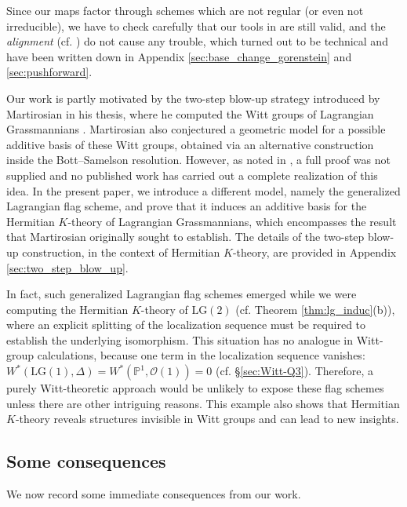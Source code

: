 \documentclass[a4paper]{amsart}
\theoremstyle{plain}
\theoremstyle{definition}
\numberwithin{equation}{section}
\newcommand{\LG}{\mathrm{LG}}
\begin{document}
Since our maps factor through schemes which are not regular (or even not irreducible), we have to check carefully that our tools in \cite{huang2023the} are still valid, and the \textit{alignment} (cf. \cite{balmer2012bases}) do not cause any trouble, which turned out to be technical and have been written down in Appendix \ref{sec:base_change_gorenstein} and \ref{sec:pushforward}.

Our work is partly motivated by the two-step blow-up strategy introduced by Martirosian in his thesis, where he computed the Witt groups of Lagrangian Grassmannians \cite{martirosian2021witt}.  Martirosian also conjectured a geometric model for a possible additive basis of these Witt groups, obtained via an alternative construction inside the Bott–Samelson resolution. However, as noted in \cite[Remark 3.4.6]{martirosian2021witt}, a full proof was not supplied and no published work has carried out a complete realization of this idea. In the present paper, we introduce a different model, namely the generalized Lagrangian flag scheme, and prove that it induces an additive basis for the Hermitian $K$-theory of Lagrangian Grassmannians, which encompasses the result that Martirosian originally sought to establish. The details of the two-step blow-up construction, in the context of Hermitian $K$-theory, are provided in Appendix \ref{sec:two_step_blow_up}.

In fact, such generalized Lagrangian flag schemes emerged while we were computing the Hermitian $K$-theory of $\LG(2)$ (cf. Theorem \ref{thm:lg_induc}(b)), where an explicit splitting of the localization sequence must be required to establish the underlying isomorphism. This situation has no analogue in Witt-group calculations, because one term in the localization sequence vanishes: $W^*(\LG(1), \Delta) =W^*(\mathbb{P}^1, \mathcal{O}(1)) = 0$ (cf. \S\ref{sec:Witt-Q3}). Therefore, a purely Witt-theoretic approach would be unlikely to expose these flag schemes unless there are other intriguing reasons. This example also shows that Hermitian $K$-theory reveals structures invisible in Witt groups and can lead to new insights.


\subsection{Some consequences}
We now record some immediate consequences from our work.
\end{document}
